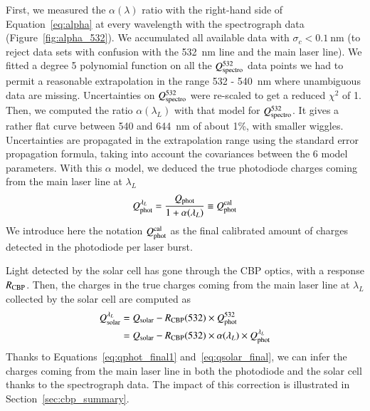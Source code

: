 First, we measured the $\alpha(\lambda)$ ratio with the right-hand side of Equation~\ref{eq:alpha} at every wavelength with the spectrograph data (Figure~\ref{fig:alpha_532}). We accumulated all available data with $\sigma_c < \SI{0.1}{\nm}$ (to reject data sets with confusion with the \SI{532}{\nm} line and the main laser line). We fitted a degree 5 polynomial function on all the $Q_{\mathrm{spectro}}^{532}$ data points we had to permit a reasonable extrapolation in the range 532 - \SI{540}{\nm} where unambiguous data are missing. Uncertainties on  $Q_{\mathrm{spectro}}^{532}$ were re-scaled to get a reduced $\chi^2$ of 1. Then, we computed the ratio $\alpha(\lambda_L)$ with that model for $Q_{\mathrm{spectro}}^{532}$. It gives a rather flat curve between 540 and \SI{644}{\nm} of about 1\%, with smaller wiggles. Uncertainties are propagated in the extrapolation range using the standard error propagation formula, taking into account the covariances between the 6 model parameters. With this $\alpha$ model, we deduced the true photodiode charges coming from the main laser line at $\lambda_L$
\begin{equation}
        Q_{\mathrm{phot}}^{\lambda_L} =  \frac{Q_{\mathrm{phot}}}{1 + \alpha(\lambda_L)} \equiv Q_{\mathrm{phot}}^{\rm cal}
        \label{eq:qphot_final1}
\end{equation}
We introduce here the notation $Q_{\mathrm{phot}}^{\rm cal}$ as the final calibrated amount of charges detected in the photodiode per laser burst. 

Light detected by the solar cell has gone through the CBP optics, with a response $R_{\mathrm{CBP}}$.
Then, the charges in the true charges coming from the main laser line at $\lambda_L$ collected by the solar cell are computed as
\begin{equation}
\begin{aligned}
    Q_{\mathrm{solar}}^{\lambda_L} & = Q_{\mathrm{solar}} - R_{\mathrm{CBP}}(532) \times Q_{\mathrm{phot}}^{532} \\ 
    & = Q_{\mathrm{solar}} - R_{\mathrm{CBP}}(532) \times \alpha(\lambda_L) \times Q_{\mathrm{phot}}^{\lambda_L}
    \label{eq:qsolar_final}
\end{aligned}
\end{equation}
Thanks to Equations~\ref{eq:qphot_final1} and~\ref{eq:qsolar_final}, we can infer the charges coming from the main laser line in both the photodiode and the solar cell thanks to the spectrograph data. The impact of this correction is illustrated in Section~\ref{sec:cbp_summary}.


